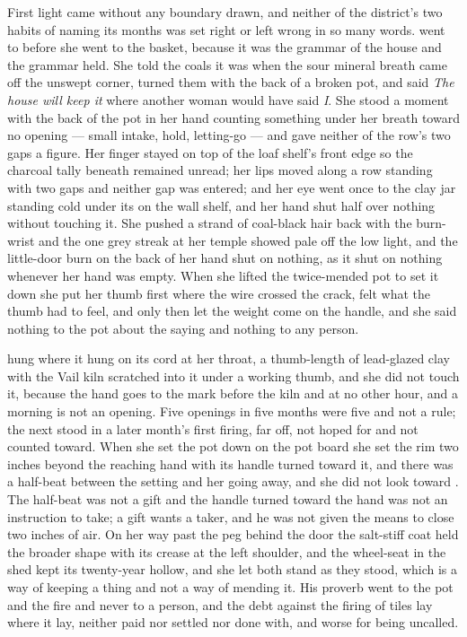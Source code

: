 First light came without any boundary drawn, and neither of the district's two habits of naming its months was set right or left wrong in so many words.  went to  before she went to the basket, because it was the grammar of the house and the grammar held. She told the coals it was  when the sour mineral breath came off the unswept corner, turned them with the back of a broken pot, and said \emph{The house will keep it} where another woman would have said \emph{I}. She stood a moment with the back of the pot in her hand counting something under her breath toward no opening --- small intake, hold, letting-go --- and gave neither of the row's two gaps a figure. Her finger stayed on top of the loaf shelf's front edge so the charcoal tally beneath remained unread; her lips moved along a row standing with two gaps and neither gap was entered; and her eye went once to the clay jar standing cold under its  on the wall shelf, and her hand shut half over nothing without touching it. She pushed a strand of coal-black hair back with the burn-wrist and the one grey streak at her temple showed pale off the low light, and the little-door burn on the back of her hand shut on nothing, as it shut on nothing whenever her hand was empty. When she lifted the twice-mended pot to set it down she put her thumb first where the wire crossed the crack, felt what the thumb had to feel, and only then let the weight come on the handle, and she said nothing to the pot about the saying and nothing to any person.

 hung where it hung on its cord at her throat, a thumb-length of lead-glazed clay with the Vail kiln scratched into it under a working thumb, and she did not touch it, because the hand goes to the mark before the kiln and at no other hour, and a morning is not an opening. Five openings in five months were five and not a rule; the next stood in a later month's first firing, far off, not hoped for and not counted toward. When she set the pot down on the pot board she set the rim two inches beyond the reaching hand with its handle turned toward it, and there was a half-beat between the setting and her going away, and she did not look toward . The half-beat was not a gift and the handle turned toward the hand was not an instruction to take; a gift wants a taker, and he was not given the means to close two inches of air. On her way past the peg behind the door the salt-stiff coat held the broader shape with its crease at the left shoulder, and the wheel-seat in the shed kept its twenty-year hollow, and she let both stand as they stood, which is a way of keeping a thing and not a way of mending it. His proverb went to the pot and the fire and never to a person, and the debt against the firing of tiles lay where it lay, neither paid nor settled nor done with, and worse for being uncalled.


